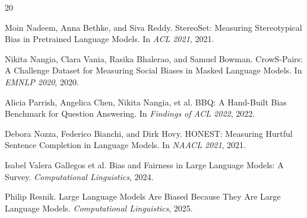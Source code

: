 \documentclass[sigplan,screen]{acmart}
\begin{document}
\begin{thebibliography}{20}

Moin Nadeem, Anna Bethke, and Siva Reddy.
\newblock StereoSet: Measuring Stereotypical Bias in Pretrained Language Models.
\newblock In \emph{ACL 2021}, 2021.

Nikita Nangia, Clara Vania, Rasika Bhalerao, and Samuel Bowman.
\newblock CrowS-Pairs: A Challenge Dataset for Measuring Social Biases in Masked Language Models.
\newblock In \emph{EMNLP 2020}, 2020.

Alicia Parrish, Angelica Chen, Nikita Nangia, et al.
\newblock BBQ: A Hand-Built Bias Benchmark for Question Answering.
\newblock In \emph{Findings of ACL 2022}, 2022.

Debora Nozza, Federico Bianchi, and Dirk Hovy.
\newblock HONEST: Measuring Hurtful Sentence Completion in Language Models.
\newblock In \emph{NAACL 2021}, 2021.


Isabel Valera Gallegos et al.
\newblock Bias and Fairness in Large Language Models: A Survey.
\newblock \emph{Computational Linguistics}, 2024.

Philip Resnik.
\newblock Large Language Models Are Biased Because They Are Large Language Models.
\newblock \emph{Computational Linguistics}, 2025.

\end{thebibliography}


\end{document}
